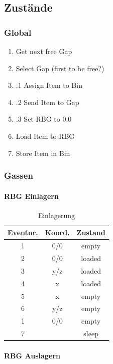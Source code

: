 \subsection{Zustände}

\subsubsection{Global}
\begin{enumerate}
  \item Get next free Gap
  \item Select Gap (first to be free?)
  \item .1 Assign Item to Bin
  \item .2 Send Item to Gap
  \item .3 Set RBG to 0.0
  \item Load Item to RBG
  \item Store Item in Bin
\end{enumerate}
%
\subsubsection{Gassen}

\paragraph{RBG Einlagern}

\begin{table}[H]
  \caption{Einlagerung}
  \label{tab:ins}

  \begin{center}
    \begin{tabular}{ccc}

		Eventnr.	& Koord.	& Zustand \\
		\hline
		1 &			0/0 	& empty\\
		2 &			0/0 	& loaded\\
		3 &			y/z 	& loaded\\
		4 	&		x 		& loaded\\
		5 &			x 		& empty\\
		6 &			y/z 	& empty\\
		1	&		0/0		& empty\\
		7 &					& sleep\\
    \end{tabular}
  \end{center}
\end{table}	
\paragraph{RBG Auslagern}

